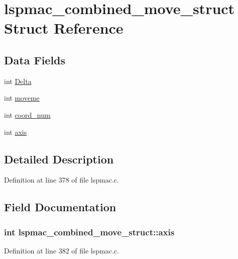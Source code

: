 \hypertarget{structlspmac__combined__move__struct}{\section{lspmac\-\_\-combined\-\_\-move\-\_\-struct Struct Reference}
\label{structlspmac__combined__move__struct}
}
\subsection*{Data Fields}
\begin{DoxyCompactItemize}
\item 
int \hyperlink{structlspmac__combined__move__struct_a5389f07fcf2b24b0e912aefb4141001d}{Delta}
\item 
int \hyperlink{structlspmac__combined__move__struct_a650f35e534bd22bdb45d5361f75eaae8}{moveme}
\item 
int \hyperlink{structlspmac__combined__move__struct_a2ae011832de3009f7a08b3081b51b7a3}{coord\-\_\-num}
\item 
int \hyperlink{structlspmac__combined__move__struct_afedb95467295e8a6aa535974f5ad6300}{axis}
\end{DoxyCompactItemize}


\subsection{Detailed Description}


Definition at line 378 of file lspmac.\-c.



\subsection{Field Documentation}
\hypertarget{structlspmac__combined__move__struct_afedb95467295e8a6aa535974f5ad6300}{
\subsubsection[{axis}]{\setlength{\rightskip}{0pt plus 5cm}int lspmac\-\_\-combined\-\_\-move\-\_\-struct\-::axis}}\label{structlspmac__combined__move__struct_afedb95467295e8a6aa535974f5ad6300}


Definition at line 382 of file lspmac.\-c.

